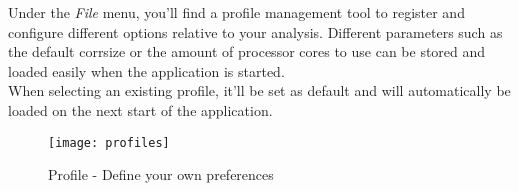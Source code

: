 \indent\indent Under the \textit{File} menu, you'll find a profile management tool to register and configure different options relative to your analysis. Different parameters such as the default corrsize or the amount of processor cores to use can be stored and loaded easily when the application is started.\\
\newline
\indent When selecting an existing profile, it'll be set as default and will automatically be loaded on the next start of the application.

\vspace{.2cm}
\begin{figure}[!h]
   \centering
   \texttt{[image: profiles]}
   \caption{Profile - Define your own preferences}
\end{figure}
